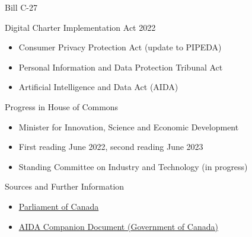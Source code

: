 \documentclass[ignorenonframetext,xcolor=x11names]{beamer}
\begin{document}
\begin{frame}{Bill C-27}
\begin{block}{Digital Charter Implementation Act 2022}
\begin{itemize}
   \item Consumer Privacy Protection Act (update to PIPEDA)
   \item Personal Information and Data Protection Tribunal Act
   \item Artificial Intelligence and Data Act (AIDA)
\end{itemize}
\end{block}
\begin{block}{Progress in House of Commons}
\begin{itemize}
   \item Minister for Innovation, Science and Economic Development
   \item First reading June 2022, second reading June 2023
   \item Standing Committee on Industry and Technology (in progress)
\end{itemize}
\end{block}

\begin{block}{Sources and Further Information}
\begin{itemize}
\item \href{https://www.parl.ca/legisinfo/en/bill/44-1/c-27}{Parliament of Canada}
\item \href{https://ised-isde.canada.ca/site/innovation-better-canada/en/artificial-intelligence-and-data-act-aida-companion-document}{AIDA Companion Document (Government of Canada)}
\end{itemize}
\end{block}
\end{frame}
\end{document}
